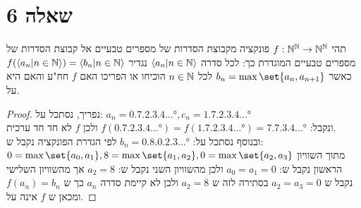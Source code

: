\documentclass{article}
\DeclarePairedDelimiter\set\{\}
\begin{document}
	\section*{שאלה 6}
	תהי $f: \mathbb{N}^{\mathbb{N}} \rightarrow \mathbb{N}^{\mathbb{N}}$ פונקציה מקבוצת הסדרות של מספרים טבעיים אל קבוצת הסדרות של מספרים טבעיים המוגדרת כך:
	לכל סדרה $\langle a_n | n \in \mathbb{N} \rangle$ נגדיר $f(\langle a_n | n \in \mathbb{N} \rangle) = \langle b_n | n \in \mathbb{N} \rangle$ כאשר $b_n = \max\set{a_n, a_{n+1}}$ לכל $n \in \mathbb{N}$
	הוכיחו או הפריכו האם $f$ חח"ע והאם היא על.

	\begin{proof}
		נפריך,
		נסתכל על: $a_n = \ang{0,7,2,3,4...}, c_n = \ang{1,7,2,3,4...}$ \\
		ונקבל: $f(\ang{0,7,2,3,4...}) = f(\ang{1,7,2,3,4...}) = \ang{7,7,3,4...}$
		ולכן $f$ לא חד חד ערכית. \\

		ובנוסף נסתכל על: $b_n = \ang{0,8,0,2,3...}$
		לפי הגדרת הפונקציה נקבל ש: \\
		$0=\max\set{a_0, a_1}, 8=\max\set{a_1, a_2}, 0=\max\set{a_2, a_3}$
		מתוך השוויון הראשון נקבל ש: $a_0=a_1=0$ ולכן מהשוויון השני נקבל ש: $a_2 = 8$ אך מהשוויון השלישי נקבל ש $a_2=a_3=0$ בסתירה לזה ש $a_2=8$
		ולכן לא קיימת סדרה $a_n$ כך ש $f(a_n) = b_n$ ומכאן ש $f$ אינה על.
	\end{proof}
\end{document}
